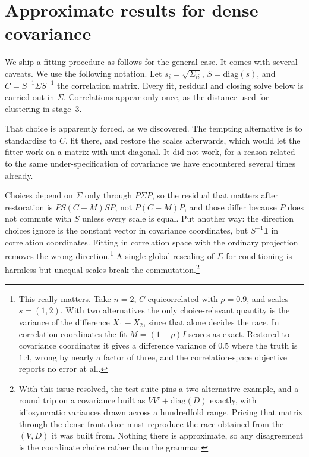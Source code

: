 \documentclass[11pt]{article}
\begin{document}
\section{Approximate results for dense covariance}\label{sec:general}

We ship a fitting procedure as follows for the general case. It comes with several caveats. We use the following notation. Let $s_i=\sqrt{\Sigma_{ii}}$,
$S=\mathrm{diag}(s)$, and $C=S^{-1}\Sigma S^{-1}$ the correlation
matrix. Every fit, residual and closing solve below is carried out in
$\Sigma$. Correlations appear only once, as the distance used for
clustering in stage~3.

That choice is apparently forced, as we discovered. The tempting
alternative is to standardize to $C$,
fit there, and restore the scales afterwards, which would let the fitter
work on a matrix with unit diagonal. It did not work, for a reason related to the same under-specification of covariance we have encountered several times already.

Choices depend on $\Sigma$ only through $P\Sigma P$, so
the residual that matters after restoration is $PS(C-M)SP$, not
$P(C-M)P$, and those differ because $P$ does not commute with $S$ unless
every scale is equal. Put another way: the direction choices ignore is
the constant vector in covariance coordinates, but $S^{-1}\mathbf{1}$ in
correlation coordinates. Fitting in correlation space with the ordinary
projection removes the wrong direction.\footnote{This really matters. Take $n=2$, $C$ equicorrelated with $\rho=0.9$, and
scales $s=(1,2)$. With two alternatives the only choice-relevant
quantity is the variance of the difference $X_1-X_2$, since that alone
decides the race. In correlation coordinates the fit $M=(1-\rho)I$ scores as exact.
Restored to covariance coordinates it gives a difference variance of
$0.5$ where the truth is $1.4$, wrong by nearly a factor of three, and
the correlation-space objective reports no error at all.} A single global rescaling of $\Sigma$ for conditioning is harmless but
unequal scales break the commutation.\footnote{With this issue resolved, the test suite pins a two-alternative example, and a round trip on a covariance built as
$VV'+\mathrm{diag}(D)$ exactly, with idiosyncratic variances drawn across
a hundredfold range. Pricing that matrix through the dense front door
must reproduce the race obtained from the $(V,D)$ it was built from.
Nothing there is approximate, so any disagreement is the coordinate
choice rather than the grammar.}
\end{document}
